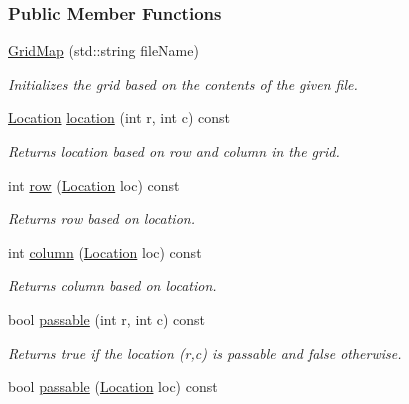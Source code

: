 \subsubsection*{Public Member Functions}
\begin{DoxyCompactItemize}
\item 
\hyperlink{structslb_1_1core_1_1sb_1_1GridMap_a55ee78cfbd7a6cb6f39796b9009167e2}{Grid\+Map} (std\+::string file\+Name)
\begin{DoxyCompactList}\small\item\em Initializes the grid based on the contents of the given file. \end{DoxyCompactList}\item 
\hyperlink{structslb_1_1core_1_1sb_1_1GridMap_ad7f78dfb03ac219e9f9047c17996d9f5}{Location} \hyperlink{structslb_1_1core_1_1sb_1_1GridMap_aff0cbd3845da8e84f6f65c82285af135}{location} (int r, int c) const 
\begin{DoxyCompactList}\small\item\em Returns location based on row and column in the grid. \end{DoxyCompactList}\item 
int \hyperlink{structslb_1_1core_1_1sb_1_1GridMap_a9c090d9a064d8da8518a2443f50882ff}{row} (\hyperlink{structslb_1_1core_1_1sb_1_1GridMap_ad7f78dfb03ac219e9f9047c17996d9f5}{Location} loc) const 
\begin{DoxyCompactList}\small\item\em Returns row based on location. \end{DoxyCompactList}\item 
int \hyperlink{structslb_1_1core_1_1sb_1_1GridMap_a55dcbbc6f1ef1c1447113a1df96c3f85}{column} (\hyperlink{structslb_1_1core_1_1sb_1_1GridMap_ad7f78dfb03ac219e9f9047c17996d9f5}{Location} loc) const 
\begin{DoxyCompactList}\small\item\em Returns column based on location. \end{DoxyCompactList}\item 
bool \hyperlink{structslb_1_1core_1_1sb_1_1GridMap_a627a821c61ac847aebbe2a4ac90355fe}{passable} (int r, int c) const 
\begin{DoxyCompactList}\small\item\em Returns {\ttfamily true} if the location {\ttfamily }(r,c) is passable and {\ttfamily false} otherwise. \end{DoxyCompactList}\item 
bool \hyperlink{structslb_1_1core_1_1sb_1_1GridMap_aa3e65ae4681eee4a020ad87192d99ebb}{passable} (\hyperlink{structslb_1_1core_1_1sb_1_1GridMap_ad7f78dfb03ac219e9f9047c17996d9f5}{Location} loc) const 

\end{DoxyCompactItemize}
